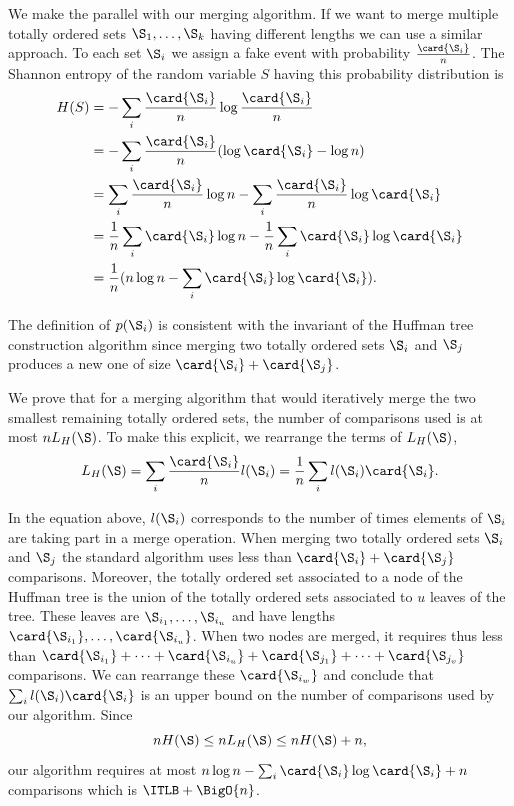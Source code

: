 We make the parallel with our merging algorithm. If we want to merge
multiple totally ordered sets \(\S_1,\ldots,\S_k\) having different lengths we can use a similar
approach. To each set \(\S_i\) we assign a fake event with probability
\(\frac{\card{\S_i}}{n}\). The Shannon entropy of the random variable
\(S\) having this probability distribution is
\begin{align*}
H(S) &= - \sum_i \frac{\card{\S_i}}{n} \log \frac{\card{\S_i}}{n}\\
&= - \sum_i \frac{\card{\S_i}}{n} (\log \card{\S_i} - \log n)\\
&= \sum_i \frac{\card{\S_i}}{n} \log n - \sum_i \frac{\card{\S_i}}{n} \log \card{\S_i}\\
&= \frac{1}{n} \sum_i \card{\S_i} \log n - \frac{1}{n} \sum_i \card{\S_i} \log
\card{\S_i}\\
&= \frac{1}{n} (n \log n - \sum_i \card{\S_i} \log \card{\S_i}).
\end{align*}

The definition of \(p(\S_i)\) is consistent with the invariant of
the Huffman tree construction algorithm since merging two totally ordered sets
\(\S_i\) and \(\S_j\) produces a new one of size \(\card{\S_i} + \card{\S_j}\).

We prove that for a merging algorithm that would iteratively merge the two
smallest remaining totally ordered sets, the number of comparisons used is at
most \(n L_H(\S)\). To make this explicit, we rearrange the terms of \(L_H(\S)\),
\begin{displaymath}
L_H(\S) = \sum_i \frac{\card{\S_i}}{n} l(\S_i) = \frac{1}{n} \sum_i l(\S_i) \card{\S_i}.
\end{displaymath}

In the equation above, \(l(\S_i)\) corresponds to the number of times elements
of \(\S_i\) are taking part in a merge operation. When merging two totally
ordered sets \(\S_i\) and \(\S_j\) the standard \tapemerge algorithm uses less
than \(\card{\S_i} + \card{\S_j}\) comparisons. Moreover, the totally ordered set
associated to a node of the Huffman tree is the union of the totally ordered
sets associated to \(u\) leaves of the tree. These leaves are
\(\S_{i_1},\ldots,\S_{i_u}\) and have lengths
\(\card{\S_{i_1}},\ldots,\card{\S_{i_u}}\). When two nodes are merged, it
requires thus less than
\(\card{\S_{i_1}}+\cdots+\card{\S_{i_u}}+\card{\S_{j_1}}+\cdots+\card{\S_{j_v}}\)
comparisons. We can rearrange these \(\card{\S_{i_w}}\) and conclude that
\(\sum_i l(\S_i) \card{\S_i}\) is an upper bound on the number of comparisons used
by our algorithm. Since
\begin{displaymath}
n H(\S) \le n L_H(\S) \le n H(\S) + n,
\end{displaymath}
our algorithm requires at most \(n \log n - \sum_i \card{\S_i} \log \card{\S_i} +
n\) comparisons which is \(\ITLB + \BigO{n}\).

